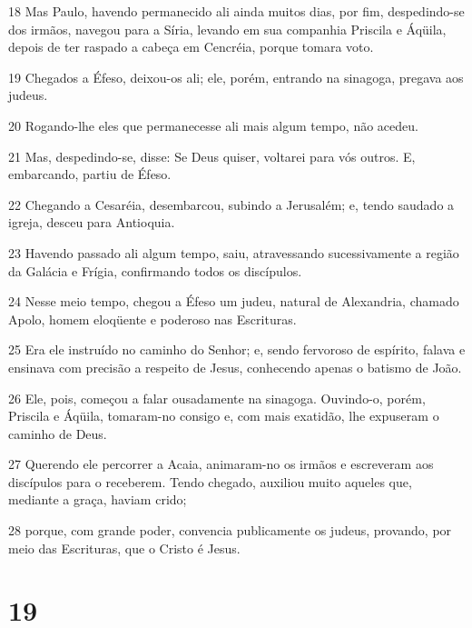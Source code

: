 \par 18 Mas Paulo, havendo permanecido ali ainda muitos dias, por fim, despedindo-se dos irmãos, navegou para a Síria, levando em sua companhia Priscila e Áqüila, depois de ter raspado a cabeça em Cencréia, porque tomara voto.
\par 19 Chegados a Éfeso, deixou-os ali; ele, porém, entrando na sinagoga, pregava aos judeus.
\par 20 Rogando-lhe eles que permanecesse ali mais algum tempo, não acedeu.
\par 21 Mas, despedindo-se, disse: Se Deus quiser, voltarei para vós outros. E, embarcando, partiu de Éfeso.
\par 22 Chegando a Cesaréia, desembarcou, subindo a Jerusalém; e, tendo saudado a igreja, desceu para Antioquia.
\par 23 Havendo passado ali algum tempo, saiu, atravessando sucessivamente a região da Galácia e Frígia, confirmando todos os discípulos.
\par 24 Nesse meio tempo, chegou a Éfeso um judeu, natural de Alexandria, chamado Apolo, homem eloqüente e poderoso nas Escrituras.
\par 25 Era ele instruído no caminho do Senhor; e, sendo fervoroso de espírito, falava e ensinava com precisão a respeito de Jesus, conhecendo apenas o batismo de João.
\par 26 Ele, pois, começou a falar ousadamente na sinagoga. Ouvindo-o, porém, Priscila e Áqüila, tomaram-no consigo e, com mais exatidão, lhe expuseram o caminho de Deus.
\par 27 Querendo ele percorrer a Acaia, animaram-no os irmãos e escreveram aos discípulos para o receberem. Tendo chegado, auxiliou muito aqueles que, mediante a graça, haviam crido;
\par 28 porque, com grande poder, convencia publicamente os judeus, provando, por meio das Escrituras, que o Cristo é Jesus.

\chapter{19}

